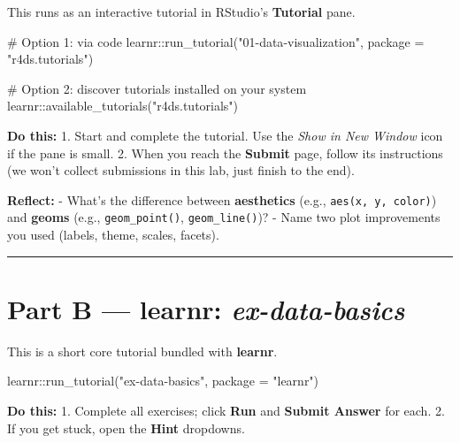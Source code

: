 \documentclass[
  letterpaper,
  DIV=11,
  numbers=noendperiod]{scrreprt}
\newenvironment{Shaded}{\begin{snugshade}}{\end{snugshade}}
\newcommand{\AttributeTok}[1]{\textcolor[rgb]{0.40,0.45,0.13}{#1}}
\newcommand{\CommentTok}[1]{\textcolor[rgb]{0.37,0.37,0.37}{#1}}
\newcommand{\FunctionTok}[1]{\textcolor[rgb]{0.28,0.35,0.67}{#1}}
\newcommand{\NormalTok}[1]{\textcolor[rgb]{0.00,0.23,0.31}{#1}}
\newcommand{\SpecialCharTok}[1]{\textcolor[rgb]{0.37,0.37,0.37}{#1}}
\newcommand{\StringTok}[1]{\textcolor[rgb]{0.13,0.47,0.30}{#1}}
\begin{document}
This runs as an interactive tutorial in RStudio's \textbf{Tutorial}
pane.

\begin{Shaded}
\begin{Highlighting}[]
\CommentTok{\# Option 1: via code}
\NormalTok{learnr}\SpecialCharTok{::}\FunctionTok{run\_tutorial}\NormalTok{(}\StringTok{"01{-}data{-}visualization"}\NormalTok{, }\AttributeTok{package =} \StringTok{"r4ds.tutorials"}\NormalTok{)}

\CommentTok{\# Option 2: discover tutorials installed on your system}
\NormalTok{learnr}\SpecialCharTok{::}\FunctionTok{available\_tutorials}\NormalTok{(}\StringTok{"r4ds.tutorials"}\NormalTok{)}
\end{Highlighting}
\end{Shaded}

\textbf{Do this:} 1. Start and complete the tutorial. Use the \emph{Show
in New Window} icon if the pane is small. 2. When you reach the
\textbf{Submit} page, follow its instructions (we won't collect
submissions in this lab, just finish to the end).

\textbf{Reflect:} - What's the difference between \textbf{aesthetics}
(e.g., \texttt{aes(x,\ y,\ color)}) and \textbf{geoms} (e.g.,
\texttt{geom\_point()}, \texttt{geom\_line()})? - Name two plot
improvements you used (labels, theme, scales, facets).

\begin{center}\rule{0.5\linewidth}{0.5pt}\end{center}

\section{\texorpdfstring{Part B --- learnr:
\emph{ex-data-basics}}{Part B --- learnr: ex-data-basics}}\label{part-b-learnr-ex-data-basics}

This is a short core tutorial bundled with \textbf{learnr}.

\begin{Shaded}
\begin{Highlighting}[]
\NormalTok{learnr}\SpecialCharTok{::}\FunctionTok{run\_tutorial}\NormalTok{(}\StringTok{"ex{-}data{-}basics"}\NormalTok{, }\AttributeTok{package =} \StringTok{"learnr"}\NormalTok{)}
\end{Highlighting}
\end{Shaded}

\textbf{Do this:} 1. Complete all exercises; click \textbf{Run} and
\textbf{Submit Answer} for each. 2. If you get stuck, open the
\textbf{Hint} dropdowns.
\end{document}
